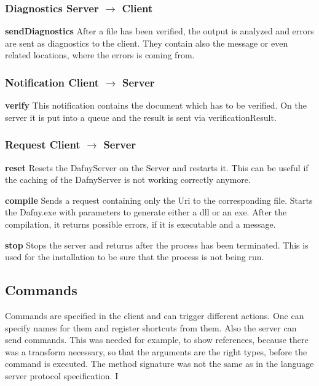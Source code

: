 \subsubsection{Diagnostics Server $\longrightarrow$ Client}

\textbf{sendDiagnostics}
After a file has been verified, the output is analyzed and errors are sent as diagnostics to the client. They contain also the message or even related locations, where the errors is coming from.  \newline

\subsubsection{Notification Client $\longrightarrow$ Server}

\textbf{verify}
This notification contains the document which has to be verified. On the server it is put into a queue and the result is sent via verificationResult. \newline

\subsubsection{Request Client $\longrightarrow$ Server}

\textbf{reset}
Resets the DafnyServer on the Server and restarts it. This can be useful if the caching of the DafnyServer is not working correctly anymore. \newline

\textbf{compile}
Sends a request containing only the Uri to the corresponding file. Starts the Dafny.exe with parameters to generate either a dll or an exe. After the compilation, it returns possible errors, if it is executable and a message.\newline

\textbf{stop}
Stops the server and returns after the process has been terminated. This is used for the installation to be sure that the process is not being run. \newline


\subsection{Commands}
Commands are specified in the client and can trigger different actions. One can specify names for them and register shortcuts from them. Also the server can send commands. This was needed for example, to show references, because there was a transform necessary, so that the arguments are the right types, before the command is executed. The method signature was not the same as in the language server protocol specification. I


